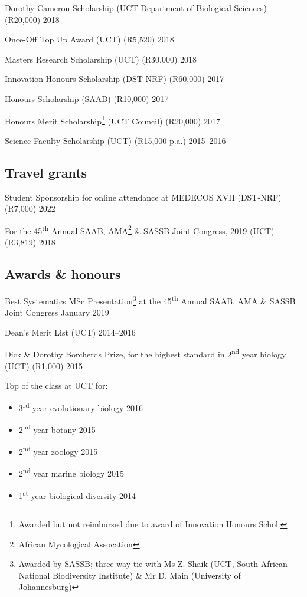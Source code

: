 \documentclass[10pt]{article}
\begin{document}
Dorothy Cameron Scholarship (UCT Department of Biological Sciences) (R20,000)
                                                            \hfill 2018

Once-Off Top Up Award (UCT) (R5,520)                        \hfill 2018

Masters Research Scholarship (UCT) (R30,000)                \hfill 2018

Innovation Honours Scholarship (DST-NRF) (R60,000)          \hfill 2017

Honours Scholarship (SAAB) (R10,000)                        \hfill 2017

Honours Merit Scholarship\footnote{Awarded but not reimbursed due to award of 
Innovation Honours Schol.} (UCT Council) (R20,000)          \hfill 2017

Science Faculty Scholarship (UCT) (R15,000 p.a.)      \hfill 2015--2016

\subsection*{Travel grants}

Student Sponsorship for online attendance at MEDECOS XVII (DST-NRF) (R7,000)
                                                            \hfill 2022

For the 45\textsuperscript{th} Annual SAAB, AMA\footnote{African Mycological
Assocation} \& SASSB Joint Congress, 2019 (UCT) (R3,819)    \hfil 2018

\subsection*{Awards \& honours}

Best Systematics MSc Presentation\footnote{Awarded by SASSB; three-way tie with 
Ms Z. Shaik (UCT, South African National Biodiversity Institute) \& Mr D. Main
(University of Johannesburg)} at the 45\textsuperscript{th} Annual SAAB, AMA \&
SASSB Joint Congress                                \hfill January 2019

Dean's Merit List (UCT)                               \hfill 2014--2016

Dick \& Dorothy Borcherds Prize, for the highest standard in 
2\textsuperscript{nd} year biology (UCT) (R1,000)           \hfill 2015

Top of the class at UCT for:

\begin{itemize}[noitemsep, nolistsep]
  \item 3\textsuperscript{rd} year evolutionary biology     \hfill 2016
  \item 2\textsuperscript{nd} year botany                   \hfill 2015
  \item 2\textsuperscript{nd} year zoology                  \hfill 2015
  \item 2\textsuperscript{nd} year marine biology           \hfill 2015
  \item 1\textsuperscript{st} year biological diversity     \hfill 2014
\end{itemize}
\end{document}
